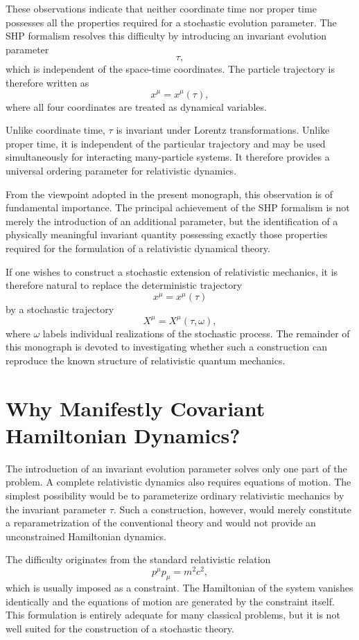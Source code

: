 These observations indicate that neither coordinate time nor proper time
possesses all the properties required for a stochastic evolution parameter.
The SHP formalism resolves this difficulty by introducing an invariant
evolution parameter
\[\tau,\]
which is independent of the space-time coordinates. The particle trajectory is
therefore written as
\[x^{\mu}=x^{\mu}(\tau),\]
where all four coordinates are treated as dynamical variables.

Unlike coordinate time, $\tau$ is invariant under Lorentz transformations.
Unlike proper time, it is independent of the particular trajectory and may be
used simultaneously for interacting many-particle systems. It therefore
provides a universal ordering parameter for relativistic dynamics.

From the viewpoint adopted in the present monograph, this observation is of
fundamental importance. The principal achievement of the SHP formalism is not
merely the introduction of an additional parameter, but the identification of
a physically meaningful invariant quantity possessing exactly those properties
required for the formulation of a relativistic dynamical theory.

If one wishes to construct a stochastic extension of relativistic mechanics,
it is therefore natural to replace the deterministic trajectory
\[x^{\mu}=x^{\mu}(\tau)\]
by a stochastic trajectory
\[X^{\mu}=X^{\mu}(\tau,\omega),\]
where $\omega$ labels individual realizations of the stochastic process.
The remainder of this monograph is devoted to investigating whether such a
construction can reproduce the known structure of relativistic quantum
mechanics.
\section{Why Manifestly Covariant Hamiltonian Dynamics?}

The introduction of an invariant evolution parameter solves only one part of
the problem. A complete relativistic dynamics also requires equations of
motion. The simplest possibility would be to parameterize ordinary relativistic
mechanics by the invariant parameter $\tau$. Such a construction, however,
would merely constitute a reparametrization of the conventional theory and
would not provide an unconstrained Hamiltonian dynamics.

The difficulty originates from the standard relativistic relation
\[p^\mu p_\mu = m^2c^2,\]
which is usually imposed as a constraint. The Hamiltonian of the system
vanishes identically and the equations of motion are generated by the
constraint itself. This formulation is entirely adequate for many classical
problems, but it is not well suited for the construction of a stochastic
theory.

